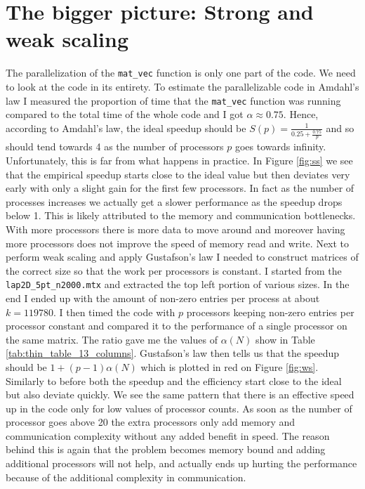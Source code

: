 \documentclass{article}
\begin{document}
\section{The bigger picture: Strong and weak scaling}
The parallelization of the \texttt{mat\_vec} function is only one part of the code. We need to look at the code in its entirety. To estimate the parallelizable code in Amdahl’s law I measured the proportion of time that the \texttt{mat\_vec} function was running compared to the total time of the whole code and I got $\alpha \approx 0.75$. Hence, according to Amdahl’s law, the ideal speedup should be $S(p) = \frac{1}{0.25 + \frac{0.75}{p}}$ and so should tend towards 4 as the number of processors $p$ goes towards infinity. Unfortunately, this is far from what happens in practice. In Figure \ref{fig:ss} we see that the empirical speedup starts close to the ideal value but then deviates very early with only a slight gain for the first few processors. In fact as the number of processes increases we actually get a slower performance as the speedup drops below 1. This is likely attributed to the memory and communication bottlenecks. With more processors there is more data to move around and moreover having more processors does not improve the speed of memory read and write.
Next to perform weak scaling and apply Gustafson’s law I needed to construct matrices of the correct size so that the work per processors is constant. I started from the \texttt{lap2D\_5pt\_n2000.mtx} and extracted the top left portion of various sizes. In the end I ended up with the amount of non-zero entries per process at about $k = 119780$. I then timed the code with $p$ processors keeping non-zero entries per processor constant and compared it to the performance of a single processor on the same matrix. The ratio gave me the values of $\alpha(N)$ show in Table \ref{tab:thin_table_13_columns}. Gustafson’s law then tells us that the speedup should be $1+ (p-1)\alpha(N)$ which is plotted in red on Figure \ref{fig:ws}. Similarly to before both the speedup and the efficiency start close to the ideal but also deviate quickly. We see the same pattern that there is an effective speed up in the code only for low values of processor counts. As soon as the number of processor goes above 20 the extra processors only add memory and communication complexity without any added benefit in speed. The reason behind this is again that the problem becomes memory bound and adding additional processors will not help, and actually ends up hurting the performance because of the additional complexity in communication. 
\end{document}
